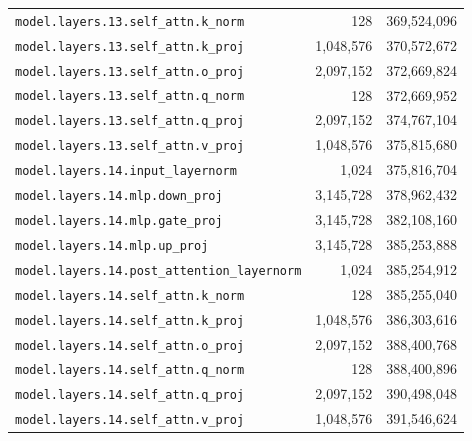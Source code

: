 \documentclass[10pt,a4paper]{article}
\theoremstyle{definition}
\begin{document}
\begin{appendices}
\begin{longtable}{p{9.5cm}rr}
\texttt{model.\allowbreak{}layers.\allowbreak{}13.\allowbreak{}self\_attn.\allowbreak{}k\_norm} & 128 & 369,524,096 \\
\texttt{model.\allowbreak{}layers.\allowbreak{}13.\allowbreak{}self\_attn.\allowbreak{}k\_proj} & 1,048,576 & 370,572,672 \\
\texttt{model.\allowbreak{}layers.\allowbreak{}13.\allowbreak{}self\_attn.\allowbreak{}o\_proj} & 2,097,152 & 372,669,824 \\
\texttt{model.\allowbreak{}layers.\allowbreak{}13.\allowbreak{}self\_attn.\allowbreak{}q\_norm} & 128 & 372,669,952 \\
\texttt{model.\allowbreak{}layers.\allowbreak{}13.\allowbreak{}self\_attn.\allowbreak{}q\_proj} & 2,097,152 & 374,767,104 \\
\texttt{model.\allowbreak{}layers.\allowbreak{}13.\allowbreak{}self\_attn.\allowbreak{}v\_proj} & 1,048,576 & 375,815,680 \\
\texttt{model.\allowbreak{}layers.\allowbreak{}14.\allowbreak{}input\_layernorm} & 1,024 & 375,816,704 \\
\texttt{model.\allowbreak{}layers.\allowbreak{}14.\allowbreak{}mlp.\allowbreak{}down\_proj} & 3,145,728 & 378,962,432 \\
\texttt{model.\allowbreak{}layers.\allowbreak{}14.\allowbreak{}mlp.\allowbreak{}gate\_proj} & 3,145,728 & 382,108,160 \\
\texttt{model.\allowbreak{}layers.\allowbreak{}14.\allowbreak{}mlp.\allowbreak{}up\_proj} & 3,145,728 & 385,253,888 \\
\texttt{model.\allowbreak{}layers.\allowbreak{}14.\allowbreak{}post\_attention\_layernorm} & 1,024 & 385,254,912 \\
\texttt{model.\allowbreak{}layers.\allowbreak{}14.\allowbreak{}self\_attn.\allowbreak{}k\_norm} & 128 & 385,255,040 \\
\texttt{model.\allowbreak{}layers.\allowbreak{}14.\allowbreak{}self\_attn.\allowbreak{}k\_proj} & 1,048,576 & 386,303,616 \\
\texttt{model.\allowbreak{}layers.\allowbreak{}14.\allowbreak{}self\_attn.\allowbreak{}o\_proj} & 2,097,152 & 388,400,768 \\
\texttt{model.\allowbreak{}layers.\allowbreak{}14.\allowbreak{}self\_attn.\allowbreak{}q\_norm} & 128 & 388,400,896 \\
\texttt{model.\allowbreak{}layers.\allowbreak{}14.\allowbreak{}self\_attn.\allowbreak{}q\_proj} & 2,097,152 & 390,498,048 \\
\texttt{model.\allowbreak{}layers.\allowbreak{}14.\allowbreak{}self\_attn.\allowbreak{}v\_proj} & 1,048,576 & 391,546,624 \\

\end{longtable}
\end{appendices}
\end{document}
